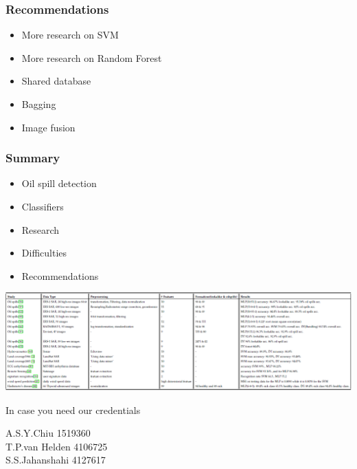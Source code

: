\documentclass{beamer}
\begin{document}
\begin{frame}
\frametitle{Recommendations}
\begin{itemize}
	\item More research on SVM
	\item More research on Random Forest
	\item Shared database
	\item Bagging
	\item Image fusion

\end{itemize}
\end{frame}


\begin{frame}
\frametitle{Summary}
\begin{itemize}
	\item Oil spill detection
	\item Classifiers
	\item Research
	\item Difficulties
	\item Recommendations

\end{itemize}
\end{frame}


\begin{frame}

\end{frame}

\begin{frame}

\includegraphics[width=\textwidth]{./img/table.png}

\end{frame}

\begin{frame}
In case you need our credentials

A.S.Y.Chiu 1519360\\ T.P.van Helden 4106725\\ S.S.Jahanshahi 4127617


\end{frame}
\end{document}
